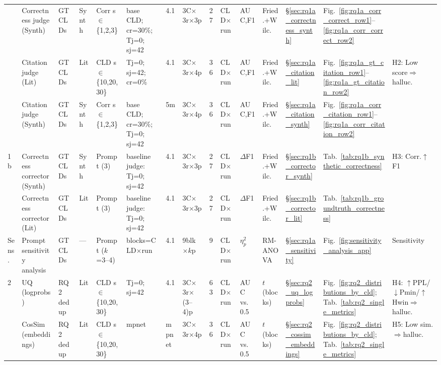 \begin{landscape}
\begin{table}[H]
{\begin{tabular}{@{}l l l l l l l l c l l l l l l@{}}
  & Correctness judge (Synth) & GT CLDs & Synth & Corr s$\in$\{1,2,3\} & base CLD; cr=30\%; Tj=0; sj=42 & 4.1 & 3C$\times$3r$\times$3p & 27 & CLD$\times$run & AUC,F1 & Fried.+Wilc. & \S\ref{sec:rq1a_correctness_synth} & Fig.~\ref{fig:rq1a_corr_correct_row1}--\ref{fig:rq1a_corr_correct_row2} & \\
  & Citation judge (Lit) & GT CLDs & Lit & CLD s$\in$\{10,20,30\} & Tj=0; sj=42; cr=0\% & 4.1 & 3C$\times$3r$\times$4p & 36 & CLD$\times$run & AUC,F1 & Fried.+Wilc. & \S\ref{sec:rq1a_citation_lit} & Fig.~\ref{fig:rq1a_gt_citation_row1}--\ref{fig:rq1a_gt_citation_row2} & \multirow{2}{*}{H2: Low score$\Rightarrow$halluc.} \\
  & Citation judge (Synth) & GT CLDs & Synth & Corr s$\in$\{1,2,3\} & base CLD; cr=30\%; Tj=0; sj=42 & 5m & 3C$\times$3r$\times$4p & 36 & CLD$\times$run & AUC,F1 & Fried.+Wilc. & \S\ref{sec:rq1a_citation_synth} & Fig.~\ref{fig:rq1a_corr_citation_row1}--\ref{fig:rq1a_corr_citation_row2} & \\
\midrule
\multirow{2}{*}{1b}
  & Correctness corrector (Synth) & GT CLDs & Synth & Prompt (3) & baseline judge: Tj=0; sj=42 & 4.1 & 3C$\times$3r$\times$3p & 27 & CLD$\times$run & $\Delta$F1 & Fried.+Wilc. & \S\ref{sec:rq1b_corrector_synth} & Tab.~\ref{tab:rq1b_synthetic_correctness} & \multirow{2}{*}{H3: Corr.$\uparrow$F1} \\
  & Correctness corrector (Lit) & GT CLDs & Lit & Prompt (3) & baseline judge: Tj=0; sj=42 & 4.1 & 3C$\times$3r$\times$3p & 27 & CLD$\times$run & $\Delta$F1 & Fried.+Wilc. & \S\ref{sec:rq1b_corrector_lit} & Tab.~\ref{tab:rq1b_groundtruth_correctness} & \\
\midrule
Sens. & Prompt sensitivity analysis & GT CLDs & --- & Prompt ($k$=3--4) & blocks=CLD$\times$run & 4.1 & 9blk$\times k$p & 9 & CLD$\times$run & $\eta^2_p$ & RM-ANOVA & \S\ref{sec:rq1a_sensitivity} & Fig.~\ref{fig:sensitivity_analysis_app} & Sensitivity \\
\midrule
\multirow{2}{*}{2}
  & UQ (logprobs) & RQ2 dedup & Lit & CLD s$\in$\{10,20,30\} & Tj=0; sj=42 & 4.1 & 3C$\times$3r$\times$(3--4)p & 63 & CLD$\times$run & AUC vs.\ 0.5 & $t$ (blocks) & \S\ref{sec:rq2_uq_logprobs} & Fig.~\ref{fig:rq2_distributions_by_cld}; Tab.~\ref{tab:rq2_single_metrics} & H4: $\uparrow$PPL/$\downarrow$Pmin/$\uparrow$Hwin$\Rightarrow$halluc. \\
  & CosSim (embeddings) & RQ2 dedup & Lit & CLD s$\in$\{10,20,30\} & mpnet & mpnet & 3C$\times$3r$\times$4p & 36 & CLD$\times$run & AUC vs.\ 0.5 & $t$ (blocks) & \S\ref{sec:rq2_cossim_embeddings} & Fig.~\ref{fig:rq2_distributions_by_cld}; Tab.~\ref{tab:rq2_single_metrics} & H5: Low sim.$\Rightarrow$halluc. \\

\end{tabular}}
\end{table}
\end{landscape}
